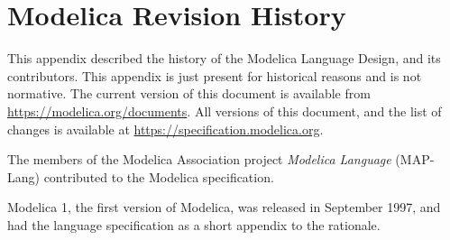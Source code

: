 \chapter{Modelica Revision History}\label{modelica-revision-history}

This appendix described the history of the Modelica Language Design, and its contributors.
This appendix is just present for historical reasons and is not normative.
The current version of this document is available from \url{https://modelica.org/documents}.
All versions of this document, and the list of changes is available at \url{https://specification.modelica.org}.

The members of the Modelica Association project \emph{Modelica Language} (MAP-Lang) contributed to the Modelica specification.

Modelica 1, the first version of Modelica, was released in September 1997, and had the language specification as a short appendix to the rationale.
